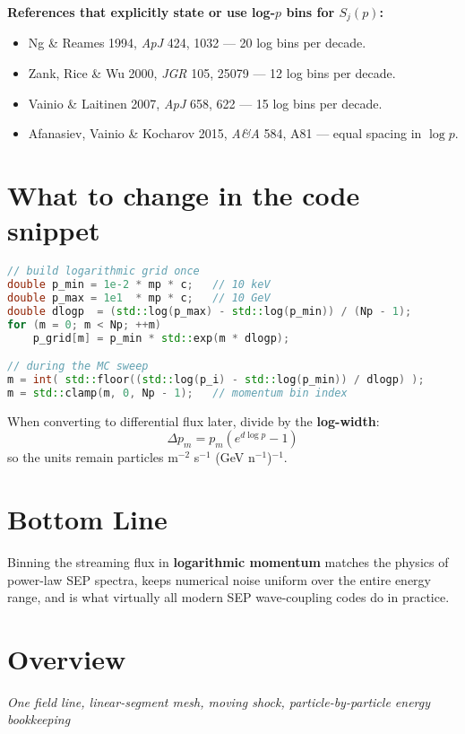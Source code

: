 \vspace{1em}

\noindent \textbf{References that explicitly state or use log-$p$ bins for $S_j(p)$:}
\begin{itemize}
    \item Ng \& Reames 1994, \textit{ApJ} 424, 1032 — 20 log bins per decade.
    \item Zank, Rice \& Wu 2000, \textit{JGR} 105, 25079 — 12 log bins per decade.
    \item Vainio \& Laitinen 2007, \textit{ApJ} 658, 622 — 15 log bins per decade.
    \item Afanasiev, Vainio \& Kocharov 2015, \textit{A\&A} 584, A81 — equal spacing in $\log p$.
\end{itemize}

\section*{What to change in the code snippet}

\begin{lstlisting}[language=C++,basicstyle=\ttfamily\footnotesize]
// build logarithmic grid once
double p_min = 1e-2 * mp * c;   // 10 keV
double p_max = 1e1  * mp * c;   // 10 GeV
double dlogp  = (std::log(p_max) - std::log(p_min)) / (Np - 1);
for (m = 0; m < Np; ++m)
    p_grid[m] = p_min * std::exp(m * dlogp);

// during the MC sweep
m = int( std::floor((std::log(p_i) - std::log(p_min)) / dlogp) );
m = std::clamp(m, 0, Np - 1);   // momentum bin index
\end{lstlisting}

\vspace{1em}

\noindent When converting to differential flux later, divide by the \textbf{log-width}:
\[
\Delta p_m = p_m \left(e^{d \log p} - 1\right)
\]
so the units remain particles m$^{-2}$ s$^{-1}$ (GeV n$^{-1}$)$^{-1}$.

\section*{Bottom Line}

Binning the streaming flux in \textbf{logarithmic momentum} matches the physics of power-law SEP spectra, keeps numerical noise uniform over the entire energy range, and is what virtually all modern SEP wave-coupling codes do in practice.


\section*{Overview}
\emph{One field line, linear-segment mesh, moving shock, particle-by-particle energy bookkeeping}

